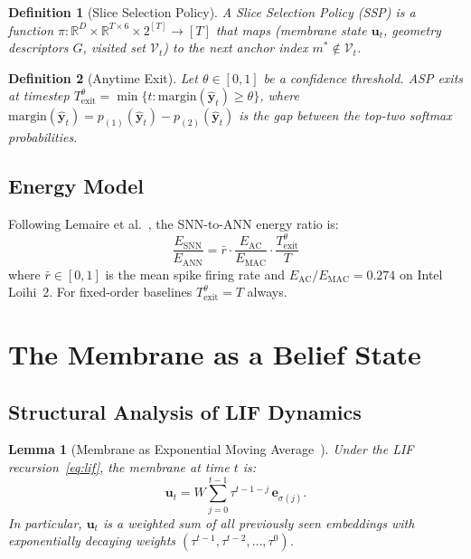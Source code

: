 \documentclass[11pt,a4paper]{article}
\newtheorem{lemma}[theorem]{Lemma}
\newtheorem{definition}{Definition}[section]
\newcommand{\bu}{\mathbf{u}}
\newcommand{\be}{\mathbf{e}}
\newcommand{\by}{\mathbf{y}}
\newcommand{\bW}{W}
\newcommand{\RR}{\mathbb{R}}
\newcommand{\rbar}{\bar{r}}
\begin{document}
\begin{definition}[Slice Selection Policy]
A \emph{Slice Selection Policy (SSP)} is a function
$\pi: \RR^D \times \RR^{T \times 6} \times 2^{[T]} \to [T]$
that maps (membrane state $\bu_t$, geometry descriptors $G$, visited set
$\mathcal{V}_t$) to the next anchor index $m^* \notin \mathcal{V}_t$.
\end{definition}

\begin{definition}[Anytime Exit]
Let $\theta \in [0,1]$ be a confidence threshold.  ASP exits at timestep
$T^\theta_\mathrm{exit} = \min\{t : \mathrm{margin}(\hat{\by}_t) \geq \theta\}$,
where $\mathrm{margin}(\hat{\by}_t) = p_{(1)}(\hat{\by}_t) - p_{(2)}(\hat{\by}_t)$
is the gap between the top-two softmax probabilities.
\end{definition}

\subsection{Energy Model}

Following Lemaire et al.~\cite{lemaire2022}, the SNN-to-ANN energy ratio is:
\begin{equation}
  \frac{E_\mathrm{SNN}}{E_\mathrm{ANN}}
  = \rbar \cdot \frac{E_\mathrm{AC}}{E_\mathrm{MAC}} \cdot \frac{T^\theta_\mathrm{exit}}{T}
  \label{eq:energy}
\end{equation}
where $\rbar \in [0,1]$ is the mean spike firing rate and $E_\mathrm{AC}/E_\mathrm{MAC}
= 0.274$ on Intel Loihi~2.  For fixed-order baselines $T^\theta_\mathrm{exit} = T$
always.

\section{The Membrane as a Belief State}

\subsection{Structural Analysis of LIF Dynamics}

\begin{lemma}[Membrane as Exponential Moving Average~{\cite{fang2021plif}}]
\label{lem:ema}
Under the LIF recursion~\eqref{eq:lif}, the membrane at time $t$ is:
\begin{equation}
  \bu_t = \bW \sum_{j=0}^{t-1} \tau^{t-1-j}\, \be_{\sigma(j)}.
  \label{eq:ema}
\end{equation}
In particular, $\bu_t$ is a weighted sum of all previously seen embeddings with
\emph{exponentially decaying} weights $(\tau^{t-1}, \tau^{t-2}, \ldots, \tau^0)$.
\end{lemma}
\end{document}
